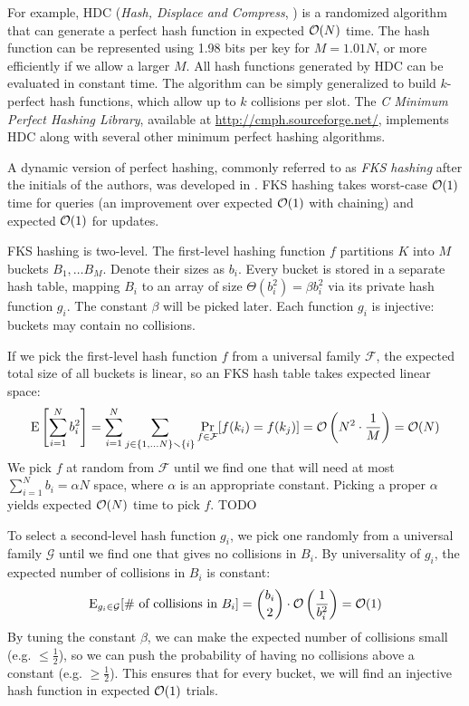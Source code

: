 For example, HDC (\textit{Hash, Displace and Compress},
\cite{hdc-hashing}) is a randomized algorithm that can generate a perfect
hash function in expected $\mathcal{O}(N)$ time. The hash function can be represented
using 1.98 bits per key for $M=1.01 N$, or more efficiently if we allow a larger
$M$. All hash functions generated by HDC can be evaluated in constant time.
The algorithm can be simply generalized to build $k$-perfect hash functions,
which allow up to $k$ collisions per slot. The \textit{C Minimum Perfect
Hashing Library}, available at \url{http://cmph.sourceforge.net/}, implements
HDC along with several other minimum perfect hashing algorithms.

A dynamic version of perfect hashing, commonly referred to as \emph{FKS
hashing} after the initials of the authors, was developed in \cite{fks-hashing}.
FKS hashing takes worst-case $\mathcal{O}(1)$ time for queries (an improvement over
expected $\mathcal{O}(1)$ with chaining) and expected $\mathcal{O}(1)$ for updates.

FKS hashing is two-level. The first-level hashing function $f$ partitions
$K$ into $M$ buckets $B_1,\ldots B_M$. Denote their sizes as $b_i$.
Every bucket is stored in a separate hash table, mapping $B_i$ to an array
of size $\Theta(b_i^2)=\beta b_i^2$ via its private hash function $g_i$.
The constant $\beta$ will be picked later.
Each function $g_i$ is injective: buckets may contain no collisions.

If we pick the first-level hash function $f$ from a universal family
$\mathcal{F}$, the expected total size of all buckets is linear, so an FKS
hash table takes expected linear space:
$$\mathrm{E}\left[\sum_{i=1}^N b_i^2\right]=
	\sum_{i=1}^N \sum_{j\in\{1,\ldots N\}\smallsetminus\{i\}}
	\Pr_{f\in\mathcal{F}}[f(k_i)=f(k_j)]=
	\mathcal{O}\left(N^2\cdot\frac{1}{M}\right)=\mathcal{O}(N)$$
We pick $f$ at random from $\mathcal{F}$ until we find one that will need at
most $\sum_{i=1}^N b_i=\alpha N$ space, where $\alpha$ is an appropriate
constant. Picking a proper $\alpha$ yields expected $\mathcal{O}(N)$ time to pick $f$.
TODO

To select a second-level hash function $g_i$, we pick one randomly from
a universal family $\mathcal{G}$ until we find one that gives no collisions
in $B_i$. By universality of $g_i$, the expected number of collisions in $B_i$
is constant:
$$\mathrm{E}_{g_i\in\mathcal{G}}[\text{\# of collisions in }B_i]=
	{b_i\choose 2}\cdot\mathcal{O}\left(\frac{1}{b_i^2}\right)=\mathcal{O}(1)$$
By tuning the constant $\beta$, we can make the expected number of collisions
small (e.g. $\leq\frac{1}{2}$), so we can push the probability of having no
collisions above a constant (e.g. $\geq\frac{1}{2}$). This ensures that for
every bucket, we will find an injective hash function in expected $\mathcal{O}(1)$
trials.

